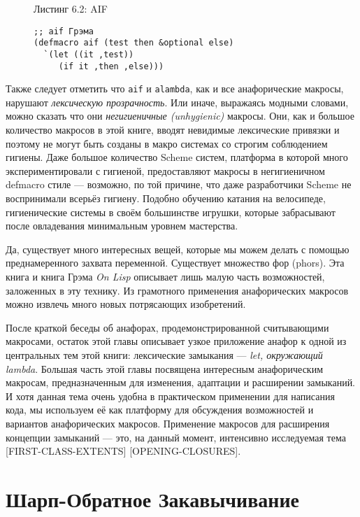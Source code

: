 \begin{figure}Листинг 6.2: AIF\label{listing_6.2}
\listbegin
\begin{verbatim}
;; aif Грэма
(defmacro aif (test then &optional else)
  `(let ((it ,test))
     (if it ,then ,else)))
\end{verbatim}
\listend
\end{figure}

Также следует отметить что \verb"aif" и \verb"alambda", как и все анафорические макросы, нарушают \emph{лексическую прозрачность}. Или иначе, выражаясь модными словами, можно сказать что они \emph{негигиеничные (unhygienic)} макросы. Они, как и большое количество макросов в этой книге, вводят невидимые лексические привязки и поэтому не могут быть созданы в макро системах со строгим соблюдением гигиены. Даже большое количество Scheme систем, платформа в которой много экспериментировали с гигиеной, предоставляют макросы в негигиеничном defmacro стиле --- возможно, по той причине, что даже разработчики Scheme не воспринимали всерьёз гигиену. Подобно обучению катания на велосипеде, гигиенические системы в своём большинстве игрушки, которые забрасывают после овладевания минимальным уровнем мастерства.

Да, существует много интересных вещей, которые мы можем делать с помощью преднамеренного захвата переменной. Существует множество фор (phors). Эта книга и книга Грэма \emph{On Lisp} описывает лишь малую часть возможностей, заложенных в эту технику. Из грамотного применения анафорических макросов можно извлечь много новых потрясающих изобретений.

После краткой беседы об анафорах, продемонстрированной считывающими макросами, остаток этой главы описывает узкое приложение анафор к одной из центральных тем этой книги: лексические замыкания --- \emph{let, окружающий lambda}. Большая часть этой главы посвящена интересным анафорическим макросам, предназначенным для изменения, адаптации и расширении замыканий. И хотя данная тема очень удобна в практическом применении для написания кода, мы используем её как платформу для обсуждения возможностей и вариантов анафорических макросов. Применение макросов для расширения концепции замыканий --- это, на данный момент, интенсивно исследуемая тема [FIRST-CLASS-EXTENTS] [OPENING-CLOSURES].

\section{Шарп-Обратное Закавычивание}\label{section_sharp-backquote} 

